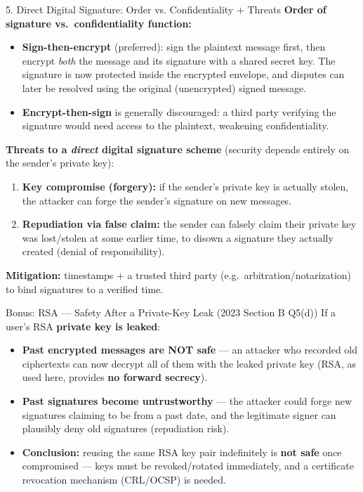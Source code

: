 \documentclass[12pt,a4paper]{article}
\begin{document}
\begin{algobox}{5. Direct Digital Signature: Order vs. Confidentiality + Threats}
\textbf{Order of signature vs.\ confidentiality function:}
\begin{itemize}[noitemsep]
  \item \textbf{Sign-then-encrypt} (preferred): sign the plaintext message first, then encrypt \emph{both} the message and its signature with a shared secret key. The signature is now protected inside the encrypted envelope, and disputes can later be resolved using the original (unencrypted) signed message.
  \item \textbf{Encrypt-then-sign} is generally discouraged: a third party verifying the signature would need access to the plaintext, weakening confidentiality.
\end{itemize}
\textbf{Threats to a \emph{direct} digital signature scheme} (security depends entirely on the sender's private key):
\begin{enumerate}[noitemsep]
  \item \textbf{Key compromise (forgery):} if the sender's private key is actually stolen, the attacker can forge the sender's signature on new messages.
  \item \textbf{Repudiation via false claim:} the sender can falsely claim their private key was lost/stolen at some earlier time, to disown a signature they actually created (denial of responsibility).
\end{enumerate}
\textbf{Mitigation:} timestamps + a trusted third party (e.g.\ arbitration/notarization) to bind signatures to a verified time.
\end{algobox}

\begin{algobox}{Bonus: RSA --- Safety After a Private-Key Leak (2023 Section B Q5(d))}
If a user's RSA \textbf{private key is leaked}:
\begin{itemize}[noitemsep]
  \item \textbf{Past encrypted messages are NOT safe} --- an attacker who recorded old ciphertexts can now decrypt all of them with the leaked private key (RSA, as used here, provides \textbf{no forward secrecy}).
  \item \textbf{Past signatures become untrustworthy} --- the attacker could forge new signatures claiming to be from a past date, and the legitimate signer can plausibly deny old signatures (repudiation risk).
  \item \textbf{Conclusion:} reusing the same RSA key pair indefinitely is \textbf{not safe} once compromised --- keys must be revoked/rotated immediately, and a certificate revocation mechanism (CRL/OCSP) is needed.
\end{itemize}
\end{algobox}
\end{document}
